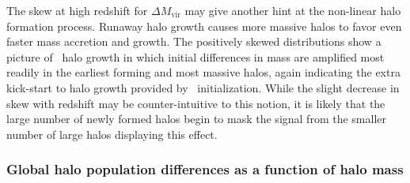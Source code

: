 The skew at high redshift for $\Delta M_{\mathrm{vir}}$ may give another hint at the non-linear halo formation process.  Runaway halo growth causes more massive halos to favor even faster mass accretion and growth.  The positively skewed distributions show a picture of \lpt\ halo growth in which initial differences in mass are amplified most readily in the earliest forming and most massive halos, again indicating the extra kick-start to halo growth provided by \lpt\ initialization.  While the slight decrease in skew with redshift may be counter-intuitive to this notion, it is likely that the large number of newly formed halos begin to mask the signal from the smaller number of large halos displaying this effect.




\subsubsection{Global halo population differences as a function of  halo mass}


